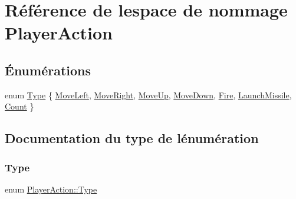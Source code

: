 \hypertarget{namespace_player_action}{}\section{Référence de l\textquotesingle{}espace de nommage Player\+Action}
\label{namespace_player_action}
\subsection*{Énumérations}
\begin{DoxyCompactItemize}
\item 
enum \hyperlink{namespace_player_action_abc541606b807d19f360a066ab7e1e268}{Type} \{ \newline
\hyperlink{namespace_player_action_abc541606b807d19f360a066ab7e1e268a23839242754772c18f27272e136448b3}{Move\+Left}, 
\hyperlink{namespace_player_action_abc541606b807d19f360a066ab7e1e268a438aa52d8dffda8ef2e1c4a4f9d171e2}{Move\+Right}, 
\hyperlink{namespace_player_action_abc541606b807d19f360a066ab7e1e268a7188c5aec395a6bec7e2ed88990ea190}{Move\+Up}, 
\hyperlink{namespace_player_action_abc541606b807d19f360a066ab7e1e268a4dd45602f33f5d96b890f96ec43b2a31}{Move\+Down}, 
\newline
\hyperlink{namespace_player_action_abc541606b807d19f360a066ab7e1e268a4ff9a85a2837807eeec4265358e32007}{Fire}, 
\hyperlink{namespace_player_action_abc541606b807d19f360a066ab7e1e268a4183e43e5cc09ef7f8b28fca333815b0}{Launch\+Missile}, 
\hyperlink{namespace_player_action_abc541606b807d19f360a066ab7e1e268a232cc6090976d2814e4a7f2386ec2dd6}{Count}
 \}
\end{DoxyCompactItemize}


\subsection{Documentation du type de l\textquotesingle{}énumération}
\hypertarget{namespace_player_action_abc541606b807d19f360a066ab7e1e268}{}\label{namespace_player_action_abc541606b807d19f360a066ab7e1e268} 
\subsubsection{\texorpdfstring{Type}{Type}}
{\footnotesize\ttfamily enum \hyperlink{namespace_player_action_abc541606b807d19f360a066ab7e1e268}{Player\+Action\+::\+Type}}

